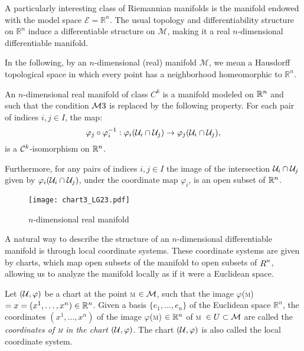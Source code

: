 A particularly interesting class of Riemannian manifolds is the manifold endowed with the model space \( \mathcal{E} = \mathbb{R}^{n} \). The usual topology and differentiability structure on \( \mathbb{R}^{n} \) induce a differentiable structure on $ \mathcal{M} $, making it a real $ n $-dimensional differentiable manifold.

In the following, by an $ n$-dimensional (real) manifold $ \mathcal{M} $, we mean a Hausdorff topological space in which every point has a neighborhood homeomorphic to $\mathbb{R}^n$.



\begin{definition}

An $n$-dimensional real manifold of class $C^k$ is a manifold modeled on $\mathbb{R}^{n}$ and such that the condition \(\mathcal{M} 3\) is replaced by the following property. For each pair of indices $i,j\in I$, the map:
\[
\varphi_j\circ\varphi_i^{-1}:\varphi_i(\mathcal{U}_i\cap \mathcal{U}_j) \to \varphi_j(\mathcal{U}_i\cap
\mathcal{U}_j),
\]
is a $\mathcal{C}^{k}$-isomorphism on $\mathbb{R}^{n}$. 

Furthermore, for any pairs of indices
$i,j\in I$ the image of the intersection $\mathcal{U}_i\cap \mathcal{U}_j$ given by
$\varphi_i(\mathcal{U}_i\cap \mathcal{U}_j)$, under the coordinate map $\varphi_i$, is an open subset of $\mathbb{R}^{n}$.
\end {definition}
\begin{figure}[h]
\texttt{[image: chart3\_LG23.pdf]} 
\caption{ $n$-dimensional real manifold}\label{F:Chart3}
\end{figure}
A natural way to describe the structure of an 
$n$-dimensional differentiable manifold is through local coordinate systems. These coordinate systems are given by charts, which map open subsets of the manifold to open subsets of $\mathop{R}^n$, allowing us to analyze the manifold locally as if it were a Euclidean space.
\begin{definition}
 Let $(\mathcal{U},\varphi)$ be a  chart at the point {\scshape m} $\in \mathcal{M}$, such that the image $\varphi$({\scshape m})$=x=(x^1,\dots,x^n)\in\mathbb{R}^{n}$.
Given a basis $\{e_{1},\dots,e_{n}\}$ of the Euclidean space $\mathbb{R}^{n}$, the coordinates $(x^1,\dots,x^n)$ of the image $\varphi$({\scshape m}) $\in\mathbb{R}^{n}$ of {\scshape m}\, $\in U\subset\mathcal{M}$ are called the \emph{coordinates of {\scshape m} in the chart }$(\mathcal{U},\varphi)$. The chart $(\mathcal{U},\varphi)$ is also called the local coordinate system.
\end{definition}


